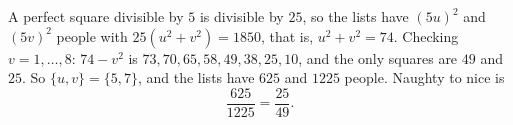 A perfect square divisible by $5$ is divisible by $25$, so the lists have $(5u)^2$ and $(5v)^2$ people with $25(u^2+v^2)=1850$, that is, $u^2+v^2=74$. Checking $v=1,\dots,8$: $74-v^2$ is $73,70,65,58,49,38,25,10$, and the only squares are $49$ and $25$. So $\{u,v\}=\{5,7\}$, and the lists have $625$ and $1225$ people. Naughty to nice is
\[
\dfrac{625}{1225}=\boxed{\dfrac{25}{49}}.
\]
